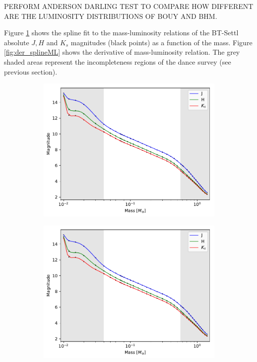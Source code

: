PERFORM ANDERSON DARLING TEST TO COMPARE HOW DIFFERENT ARE THE LUMINOSITY DISTRIBUTIONS OF BOUY AND BHM.

Figure \ref{fig:splineML} shows the spline fit to the mass-luminosity relations of the BT-Settl absolute $J,H$ and $K_s$ magnitudes (black points) as a function of the mass. Figure \ref{fig:der_splineML} shows the derivative of mass-luminosity relation. The grey shaded areas represent the incompleteness regions of the \gls{dance} survey (see previous section).

\begin{figure}[ht!]
    \centering
    \begin{subfigure}[t]{0.7\textwidth}
    \centering
       \includegraphics[page=1,width=\textwidth]{background/Figures/FitSpline_AllardModels.pdf}
        \caption{}
        \label{fig:splineML}
    \end{subfigure}
    \begin{subfigure}[t]{0.7\textwidth}
    \centering
     \includegraphics[page=2,width=\textwidth]{background/Figures/FitSpline_AllardModels.pdf}

\end{subfigure}
\end{figure}
